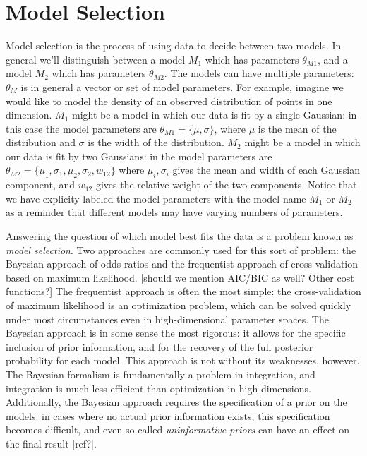 \documentclass[12pt]{article}
\newcommand{\comment}[1]{{\color{red} [#1]}}
\begin{document}
\section{Model Selection}
Model selection is the process of using data to decide between two models.
In general we'll distinguish between a model $M_1$ which has
parameters $\theta_{M1}$, and a model $M_2$ which has parameters $\theta_{M2}$.
The models can have multiple parameters:
$\theta_M$ is in general a vector or set of model parameters.
For example, imagine we would like to model the density of an observed
distribution of points in one dimension.  
$M_1$ might be a model in which our data is fit by a single
Gaussian: in this case the model parameters are $\theta_{M1} = \{\mu, \sigma\}$,
where $\mu$ is the mean of the distribution and $\sigma$ is the width of the
distribution.  $M_2$ might be a model in which our data is fit by two
Gaussians: in the model parameters are
$\theta_{M2} = \{\mu_1,\sigma_1,\mu_2,\sigma_2,w_{12}\}$ where $\mu_i,\sigma_i$
gives the mean and width of each Gaussian component, and $w_{12}$ gives the
relative weight of the two components. Notice that we have explicity
labeled the model parameters with the model name $M_1$ or $M_2$ as a reminder
that different models may have varying numbers of parameters.

Answering the question of which model best fits the data is a problem known
as {\it model selection}.  Two approaches are commonly used for this sort
of problem: the Bayesian approach of odds ratios and the frequentist approach
of cross-validation based on maximum likelihood.
\comment{should we mention AIC/BIC as well? Other cost functions?}
The frequentist approach is often the most simple: the cross-validation of
maximum likelihood is an optimization problem, which can be solved quickly
under most circumstances even in high-dimensional parameter spaces.
The Bayesian approach is in some sense the most rigorous: it allows for the
specific inclusion of prior information, and for the recovery of the full
posterior probability for each model.  This approach is not without its
weaknesses, however.  The Bayesian formalism is fundamentally a problem in
integration, and integration is much less efficient than optimization in
high dimensions.  Additionally, the Bayesian approach requires the
specification of a prior on the models: in cases where no actual prior
information exists, this specification becomes difficult, and even
so-called {\it uninformative priors} can have an effect on the final
result \comment{ref?}.
\end{document}

